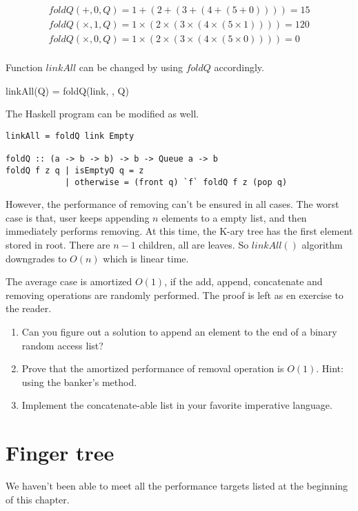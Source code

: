 \documentclass[UTF8]{article}
\begin{document}
\[
\begin{array}{l}
foldQ(+, 0, Q) = 1 + (2 + (3 + (4 + (5 + 0)))) = 15 \\
foldQ(\times, 1, Q) = 1 \times (2 \times (3 \times (4 \times (5 \times 1)))) = 120 \\
foldQ(\times, 0, Q) = 1 \times (2 \times (3 \times (4 \times (5 \times 0)))) = 0 \\
\end{array}
\]

Function $linkAll$ can be changed by using $foldQ$ accordingly.

\be
linkAll(Q) = foldQ(link, \Phi, Q)
\ee

The Haskell program can be modified as well.

\begin{lstlisting}
linkAll = foldQ link Empty

foldQ :: (a -> b -> b) -> b -> Queue a -> b
foldQ f z q | isEmptyQ q = z
            | otherwise = (front q) `f` foldQ f z (pop q)
\end{lstlisting}

However, the performance of removing can't be ensured in all cases.
The worst case is that, user keeps appending $n$ elements to a empty
list, and then immediately performs removing. At this time, the K-ary
tree has the first element stored in root. There are $n-1$ children,
all are leaves. So $linkAll()$ algorithm downgrades to $O(n)$ which
is linear time.

The average case is amortized $O(1)$, if the add, append, concatenate
and removing operations are randomly performed. The proof is left as
en exercise to the reader.

\begin{Exercise}
\begin{enumerate}
\item Can you figure out a solution to append an element to the end of a binary
random access list?

\item Prove that the amortized performance of removal operation is
$O(1)$. Hint: using the banker's method.

\item Implement the concatenate-able list in your favorite imperative language.
\end{enumerate}
\end{Exercise}

\section{Finger tree}
We haven't been able to meet all the performance targets listed at the beginning
of this chapter.
\end{document}
